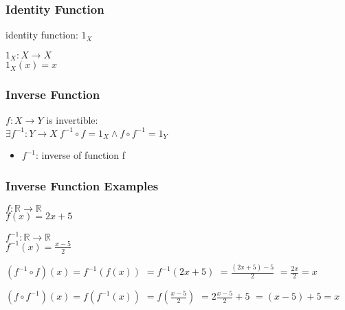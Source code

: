 \documentclass[dvipsnames]{beamer}
\begin{document}
\begin{frame}
  \frametitle{Identity Function}

  \begin{definition}
    \alert{identity function}: $1_X$

    \medskip
    $1_X: X \rightarrow X$\\
    $1_X(x) = x$
  \end{definition}
\end{frame}

\begin{frame}
  \frametitle{Inverse Function}

  \begin{definition}
    $f: X \rightarrow Y$ is \alert{invertible}:\\
      $\exists f^{-1}: Y \rightarrow X~f^{-1} \circ f = 1_X \wedge f \circ f^{-1} = 1_Y$

    \begin{itemize}
      \item $f^{-1}$: \alert{inverse} of function f
    \end{itemize}
  \end{definition}
\end{frame}

\begin{frame}
  \frametitle{Inverse Function Examples}

  \begin{example}
    $f: \mathbb{R} \rightarrow \mathbb{R}$\\
    $f(x) = 2x + 5$

    \pause
    \bigskip
    $f^{-1}: \mathbb{R} \rightarrow \mathbb{R}$\\
    $f^{-1}(x) = \frac{x - 5}{2}$

    \pause
    \bigskip
    $(f^{-1} \circ f)(x) = f^{-1}(f(x))$
    \pause
    $ = f^{-1}(2x + 5)$
    \pause
    $ = \frac{(2x + 5) - 5}{2}$
    \pause
    $ = \frac{2x}{2} = x$
    \medskip

    \pause
    $(f \circ f^{-1})(x) = f(f^{-1}(x))$
    \pause
    $ = f(\frac{x - 5}{2})$
    \pause
    $ = 2 \frac{x - 5}{2} + 5$
    \pause
    $ = (x - 5) + 5 = x$
  \end{example}
\end{frame}
\end{document}

